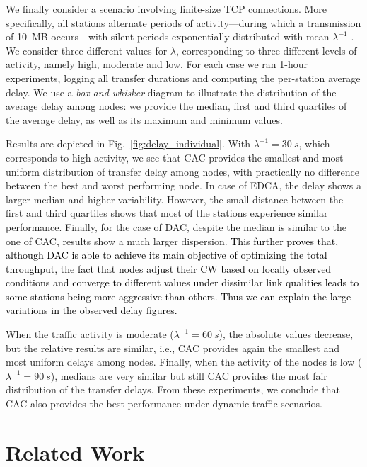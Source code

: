 \documentclass[a4paper,10pt]{article}
\newcommand{\revs}[1]{\textcolor{black}{#1}}
\begin{document}
We finally consider a scenario involving finite-size TCP connections. More specifically, all stations alternate periods of activity---during which a transmission of 10~MB occurs---with silent periods exponentially distributed with mean $\lambda^{-1}$ \cite{Crovella98}. We consider three different values for $\lambda$, corresponding to three different levels of activity, namely high, moderate and low. For each case we ran 1-hour experiments, logging all transfer durations and computing the per-station average delay. We use a \emph{box-and-whisker} diagram to illustrate the distribution of the average delay among nodes: we provide the median, first and third quartiles of the average delay, as well as its maximum and minimum values.

Results are depicted in Fig.~\ref{fig:delay_individual}. With $\lambda^{-1}=30~s$, which corresponds to high activity, we see that CAC provides the smallest and most uniform distribution of transfer delay among nodes, with practically no difference between the best and worst performing node. In case of EDCA, the delay shows a larger median and higher variability. However, the small distance between the first and third quartiles shows that most of the stations experience similar performance. Finally, for the case of DAC, despite the median is similar to the one of CAC, results show a much larger dispersion. \revs{This further proves that, although DAC is able to achieve its main objective of optimizing the total throughput, the fact that nodes adjust their CW based on locally observed conditions and converge to different values under dissimilar link qualities leads to some stations being more aggressive than others. Thus we can explain the large variations in the observed delay figures.}

When the traffic activity is moderate ($\lambda^{-1}=60~s$), the absolute values decrease, but the relative results are similar, i.e., CAC provides again the smallest and most uniform delays among nodes. Finally, when the activity of the nodes is low ($\lambda^{-1}=90~s$), medians are very similar but still CAC provides the most fair distribution of the transfer delays. From these experiments, we conclude that CAC also provides the best performance under dynamic traffic scenarios. 

\vspace{0.5em}
\section{Related Work}
\label{sec:related}
\end{document}
